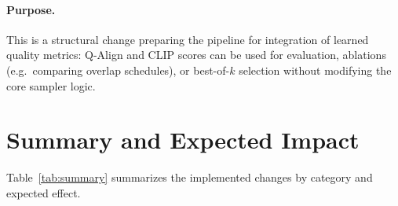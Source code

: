 \documentclass[11pt,a4paper]{article}
\begin{document}
\paragraph{Purpose.}
This is a structural change preparing the pipeline for integration of learned quality metrics:
Q-Align and CLIP scores can be used for evaluation, ablations (e.g.\ comparing overlap schedules), or best-of-$k$ selection without modifying the core sampler logic.

\section{Summary and Expected Impact}

Table~\ref{tab:summary} summarizes the implemented changes by category and expected effect.
\end{document}
